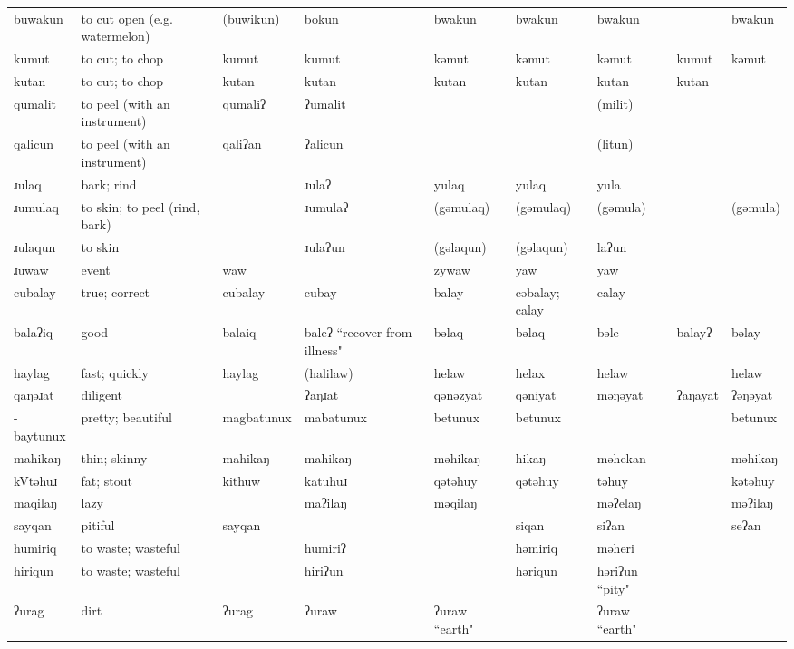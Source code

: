 \begin{landscape}
\begin{longtable}{*{9}{p{}}}
\text{*}buwakun & to cut open (e.g. watermelon) & (buwikun) & bokun & bwakun & bwakun & bwakun &  & bwakun\\
\text{*}kumut & to cut; to chop & kumut & kumut & kəmut & kəmut & kəmut & kumut & kəmut\\
\text{*}kutan & to cut; to chop & kutan & kutan & kutan & kutan & kutan & kutan & \\
\text{*}qumalit & to peel (with an instrument) & qumaliʔ & ʔumalit &  &  & (milit) &  & \\
\text{*}qalicun & to peel (with an instrument) & qaliʔan & ʔalicun &  &  & (litun) &  & \\
\text{*}ɹulaq & bark; rind &  & ɹulaʔ & yulaq & yulaq & yula &  & \\
\text{*}ɹumulaq & to skin; to peel (rind, bark) &  & ɹumulaʔ & (gəmulaq) & (gəmulaq) & (gəmula) &  & (gəmula)\\
\text{*}ɹulaqun & to skin &  & ɹulaʔun & (gəlaqun) & (gəlaqun) & laʔun &  & \\
\text{*}ɹuwaw & event & waw &  & zywaw & yaw & yaw &  & \\
\text{*}cubalay & true; correct & cubalay & cubay & balay & cəbalay; calay & calay &  & \\
\text{*}balaʔiq & good & balaiq & baleʔ ``recover from illness" & bəlaq & bəlaq & bəle & balayʔ & bəlay\\
\text{*}haylag & fast; quickly & haylag & (halilaw) & helaw & helax & helaw &  & helaw\\
\text{*}qaŋəɹat & diligent &  & ʔaŋɹat & qənəzyat & qəniyat & məŋəyat & ʔaŋayat & ʔəŋəyat\\
\text{*}-baytunux & pretty; beautiful & magbatunux & mabatunux & betunux & betunux &  &  & betunux\\
\text{*}mahikaŋ & thin; skinny & mahikaŋ & mahikaŋ & məhikaŋ & hikaŋ & məhekan &  & məhikaŋ\\
\text{*}kVtəhuɹ & fat; stout & kithuw & katuhuɹ & qətəhuy & qətəhuy & təhuy &  & kətəhuy\\
\text{*}maqilaŋ & lazy &  & maʔilaŋ & məqilaŋ &  & məʔelaŋ &  & məʔilaŋ\\
\text{*}sayqan & pitiful & sayqan &  &  & siqan & siʔan &  & seʔan\\
\text{*}humiriq & to waste; wasteful &  & humiriʔ &  & həmiriq & məheri &  & \\
\text{*}hiriqun & to waste; wasteful &  & hiriʔun &  & həriqun & həriʔun ``pity" &  & \\
\text{*}ʔurag & dirt & ʔurag & ʔuraw & ʔuraw ``earth" &  & ʔuraw ``earth" &  & \\

\end{longtable}
\end{landscape}
